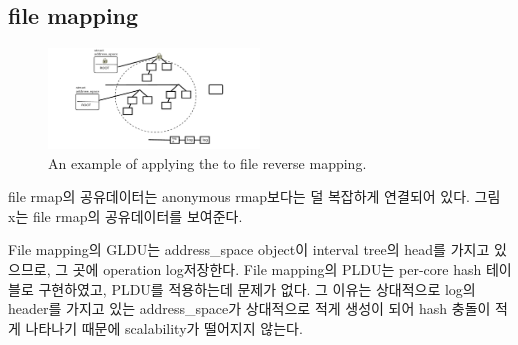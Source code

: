 

\subsection{file mapping}

\begin{figure}[tb]
  \begin{center}
     \includegraphics[width=0.5\textwidth,height=0.5\textheight,keepaspectratio]{fig/file_rmap}
  \end{center}
  \caption{An example of applying the  to file reverse mapping. }
  \label{fig:deferu}
\end{figure}


file rmap의 공유데이터는 anonymous rmap보다는 덜 복잡하게 연결되어 있다.
그림 x는 file rmap의 공유데이터를 보여준다. 


File mapping의 GLDU는 address\_space object이 interval tree의 head를 가지고 있으므로, 그 곳에
operation log저장한다. File mapping의 PLDU는 per-core hash 테이블로 구현하였고, PLDU를 적용하는데 문제가
없다.
그 이유는 상대적으로 log의 header를 가지고 있는 address\_space가 상대적으로 적게 생성이 되어 hash 충돌이 적게 나타나기
때문에 scalability가 떨어지지 않는다.






